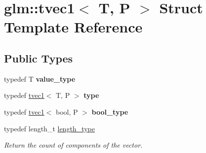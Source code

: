 \hypertarget{structglm_1_1tvec1}{}\section{glm\+:\+:tvec1$<$ T, P $>$ Struct Template Reference}
\label{structglm_1_1tvec1}
\subsection*{Public Types}
\begin{DoxyCompactItemize}
\item 
\mbox{\label{structglm_1_1tvec1_a7dd28a7610830a30c358090bde66c848}} 
typedef T {\bfseries value\+\_\+type}
\item 
\mbox{\label{structglm_1_1tvec1_a6f4d9547de6a649e654f93ffa832d9c2}} 
typedef \hyperlink{structglm_1_1tvec1}{tvec1}$<$ T, P $>$ {\bfseries type}
\item 
\mbox{\label{structglm_1_1tvec1_a0bb296cf2bfb6f0a8623528092e46b59}} 
typedef \hyperlink{structglm_1_1tvec1}{tvec1}$<$ bool, P $>$ {\bfseries bool\+\_\+type}
\item 
\mbox{\label{structglm_1_1tvec1_ae6254cf662020a8328b744b40f419527}} 
typedef length\+\_\+t \hyperlink{structglm_1_1tvec1_ae6254cf662020a8328b744b40f419527}{length\+\_\+type}
\begin{DoxyCompactList}\small\item\em Return the count of components of the vector. \end{DoxyCompactList}\end{DoxyCompactItemize}
